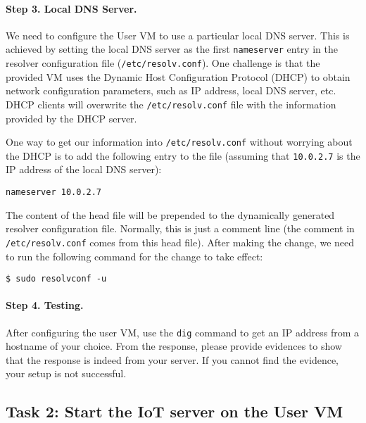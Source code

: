 \paragraph{Step 3. Local DNS Server.}
We need to configure the User VM to use a particular local DNS server. This is achieved by
setting the local DNS server as the first \texttt{nameserver} entry in the resolver
configuration file (\texttt{/etc/resolv.conf}). 
One challenge is that the provided VM uses the
Dynamic Host Configuration Protocol (DHCP) to obtain network configuration parameters, such as
IP address, local DNS server, etc. DHCP clients will overwrite the \texttt{/etc/resolv.conf}
file with the information provided by the DHCP server.

One way to get our information into \texttt{/etc/resolv.conf} without worrying about
the DHCP is to add the following entry to the 
file (assuming that \texttt{10.0.2.7} is the IP address of the local DNS server):

\begin{lstlisting}
nameserver 10.0.2.7
\end{lstlisting}

The content of the head file will be prepended to the dynamically generated resolver
configuration file. Normally, this is just a comment line (the comment in
\texttt{/etc/resolv.conf} comes from this head file). After making the change,
we need to run the following command for the change to take effect: 

\begin{lstlisting}
$ sudo resolvconf -u
\end{lstlisting}


\paragraph{Step 4. Testing.}
After configuring the user VM, use the \texttt{dig} command
to get an IP address from a hostname of your choice. From the response, please provide
evidences to show that the response is indeed from your server. If you cannot find the
evidence, your setup is not successful.



\subsection{Task 2: Start the IoT server on the User VM}

